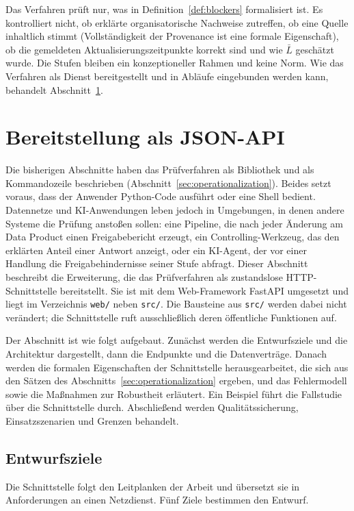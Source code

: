 \documentclass[a4paper,12pt]{article}
\theoremstyle{definition}
\begin{document}
Das Verfahren prüft nur, was in Definition~\ref{def:blockers} formalisiert ist. Es kontrolliert nicht, ob erklärte organisatorische Nachweise zutreffen, ob eine Quelle inhaltlich stimmt (Vollständigkeit der Provenance ist eine formale Eigenschaft), ob die gemeldeten Aktualisierungszeitpunkte korrekt sind und wie $\bar L$ geschätzt wurde. Die Stufen bleiben ein konzeptioneller Rahmen und keine Norm. Wie das Verfahren als Dienst bereitgestellt und in Abläufe eingebunden werden kann, behandelt Abschnitt~\ref{sec:api}.

\section{Bereitstellung als JSON-API}
\label{sec:api}

Die bisherigen Abschnitte haben das Prüfverfahren als Bibliothek und als Kommandozeile beschrieben (Abschnitt~\ref{sec:operationalization}). Beides setzt voraus, dass der Anwender Python-Code ausführt oder eine Shell bedient. Datennetze und KI-Anwendungen leben jedoch in Umgebungen, in denen andere Systeme die Prüfung anstoßen sollen: eine Pipeline, die nach jeder Änderung am Data Product einen Freigabebericht erzeugt, ein Controlling-Werkzeug, das den erklärten Anteil einer Antwort anzeigt, oder ein KI-Agent, der vor einer Handlung die Freigabehindernisse seiner Stufe abfragt. Dieser Abschnitt beschreibt die Erweiterung, die das Prüfverfahren als zustandslose HTTP-Schnittstelle bereitstellt. Sie ist mit dem Web-Framework FastAPI umgesetzt und liegt im Verzeichnis \texttt{web/} neben \texttt{src/}. Die Bausteine aus \texttt{src/} werden dabei nicht verändert; die Schnittstelle ruft ausschließlich deren öffentliche Funktionen auf.

Der Abschnitt ist wie folgt aufgebaut. Zunächst werden die Entwurfsziele und die Architektur dargestellt, dann die Endpunkte und die Datenverträge. Danach werden die formalen Eigenschaften der Schnittstelle herausgearbeitet, die sich aus den Sätzen des Abschnitts~\ref{sec:operationalization} ergeben, und das Fehlermodell sowie die Maßnahmen zur Robustheit erläutert. Ein Beispiel führt die Fallstudie über die Schnittstelle durch. Abschließend werden Qualitätssicherung, Einsatzszenarien und Grenzen behandelt.

\subsection{Entwurfsziele}
Die Schnittstelle folgt den Leitplanken der Arbeit und übersetzt sie in Anforderungen an einen Netzdienst. Fünf Ziele bestimmen den Entwurf.
\end{document}
